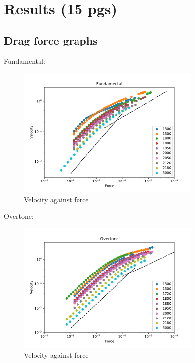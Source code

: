 \chapter{Results (15 pgs)}

\section{Drag force graphs}

Fundamental:

\begin{figure}[h]
	\centering
	\includegraphics[width=0.8\textwidth]{graphics/results/fund-force_vel}
	\caption{Velocity against force}
	\label{fund_vel_force}
\end{figure}

Overtone:

\begin{figure}[h]
	\centering
	\includegraphics[width=0.8\textwidth]{graphics/results/over-force_vel}
	\caption{Velocity against force}
	\label{over_vel_force}
\end{figure}

